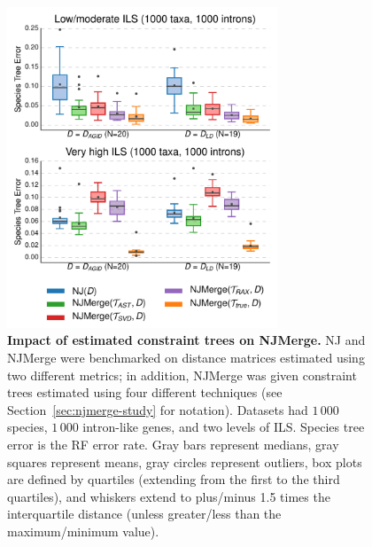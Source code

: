\begin{figure}[!h]
\centering
\includegraphics[width=0.72\textwidth]{figures/njmerge-fig6.pdf}
\caption{
{\bf Impact of estimated constraint trees on NJMerge. }
NJ and NJMerge were benchmarked on distance matrices estimated using two different metrics; in addition, NJMerge was given constraint trees estimated using four different techniques (see Section~\ref{sec:njmerge-study} for notation).
Datasets had $1\,000$ species, $1\,000$ intron-like genes, and two levels of ILS.
Species tree error is the RF error rate.
Gray bars represent medians, gray squares represent means, gray circles represent outliers, box plots are defined by quartiles (extending from the first to the third quartiles), and whiskers extend to plus/minus 1.5 times the interquartile distance (unless greater/less than the maximum/minimum value).
}
\label{fig:compare-1000-intron}
\end{figure}

